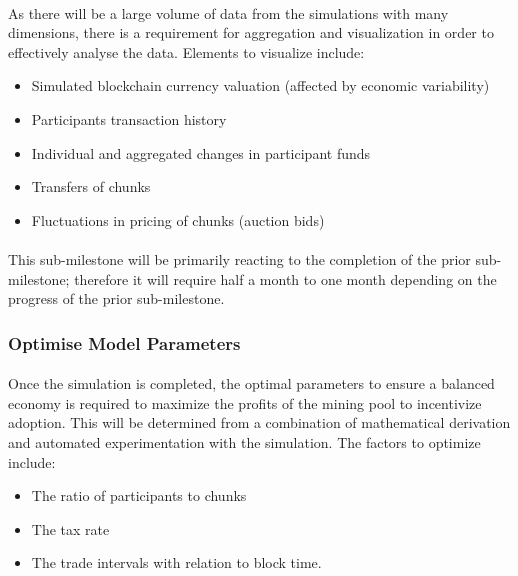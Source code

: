 \paragraph{} As there will be a large volume of data from the simulations with many dimensions, there is a requirement for aggregation and visualization in order to effectively analyse the data. Elements to visualize include:

\begin{itemize}
  \item Simulated blockchain currency valuation (affected by economic variability)
  \item Participants transaction history 
  \item Individual and aggregated changes in participant funds
  \item Transfers of chunks
  \item Fluctuations in pricing of chunks (auction bids)
\end{itemize}

\paragraph{} This sub-milestone will be primarily reacting to the completion of the prior sub-milestone; therefore it will require half a month to one month depending on the progress of the prior sub-milestone.

\subsubsection{Optimise Model Parameters}

\paragraph{} Once the simulation is completed, the optimal parameters to ensure a balanced economy is required to maximize the profits of the mining pool to incentivize adoption. This will be determined from a combination of mathematical derivation and automated experimentation with the simulation. The factors to optimize include: 

\begin{itemize}
  \item The ratio of participants to chunks
  \item The tax rate
  \item The trade intervals with relation to block time.
\end{itemize}

